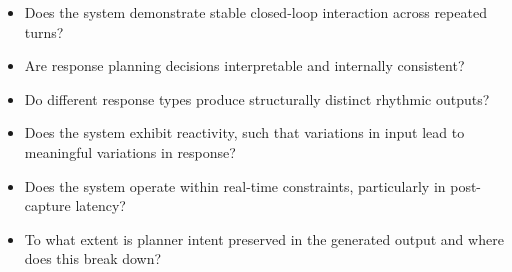 \begin{itemize}
\item
  Does the system demonstrate stable closed-loop interaction across
  repeated turns?
\item
  Are response planning decisions interpretable and internally
  consistent?
\item
  Do different response types produce structurally distinct rhythmic
  outputs?
\item
  Does the system exhibit reactivity, such that variations in input lead
  to meaningful variations in response?
\item
  Does the system operate within real-time constraints, particularly in
  post-capture latency?
\item
  To what extent is planner intent preserved in the generated output and
  where does this break down?
\end{itemize}

